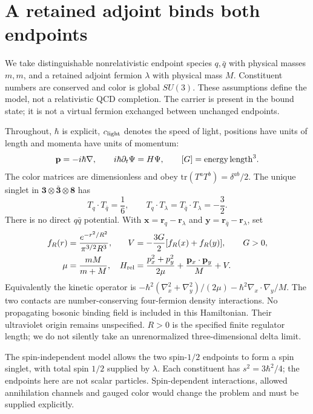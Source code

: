\section{A retained adjoint binds both endpoints}
\label{sec:model}
We take distinguishable nonrelativistic endpoint species $q,\bar q$ with physical masses $m,m$, and a retained adjoint fermion $\lambda$ with physical mass $M$. Constituent numbers are conserved and color is global $SU(3)$. These assumptions define the model, not a relativistic QCD completion. The carrier is present in the bound state; it is not a virtual fermion exchanged between unchanged endpoints.

Throughout, $\hbar$ is explicit, $c_{\rm light}$ denotes the speed of light, positions have units of length and momenta have units of momentum:
\begin{equation}
 \mathbf p=-i\hbar\nabla,\qquad
 i\hbar\partial_t\Psi=H\Psi,\qquad [G]={\rm energy}\,{\rm length}^3 .
\end{equation}
The color matrices are dimensionless and obey
$\mathrm{tr}(T^aT^b)=\delta^{ab}/2$. The unique singlet in
$\mathbf3\otimes\bar{\mathbf3}\otimes\mathbf8$ has
\begin{equation}
 T_q\cdot T_{\bar q}=\frac16,\qquad
 T_q\cdot T_\lambda=T_{\bar q}\cdot T_\lambda=-\frac32.
\end{equation}
There is no direct $q\bar q$ potential. With
$\mathbf x=\mathbf r_q-\mathbf r_\lambda$ and
$\mathbf y=\mathbf r_{\bar q}-\mathbf r_\lambda$, set
\begin{align}
 f_R(r)&=\frac{e^{-r^2/R^2}}{\pi^{3/2}R^3},&
 V&=-\frac{3G}{2}[f_R(x)+f_R(y)],\qquad G>0,\\
 \mu&=\frac{mM}{m+M},&
 H_{\rm rel}&=\frac{p_x^2+p_y^2}{2\mu}
       +\frac{\mathbf p_x\cdot\mathbf p_y}{M}+V .
 \label{eq:hamiltonian}
\end{align}
Equivalently the kinetic operator is
$-\hbar^2(\nabla_x^2+\nabla_y^2)/(2\mu)
-\hbar^2\nabla_x\cdot\nabla_y/M$.
The two contacts are number-conserving four-fermion density interactions. No propagating bosonic binding field is included in this Hamiltonian. Their ultraviolet origin remains unspecified. $R>0$ is the specified finite regulator length; we do not silently take an unrenormalized three-dimensional delta limit.

The spin-independent model allows the two spin-$1/2$ endpoints to form a spin singlet, with total spin $1/2$ supplied by $\lambda$. Each constituent has $s^2=3\hbar^2/4$; the endpoints here are not scalar particles. Spin-dependent interactions, allowed annihilation channels and gauged color would change the problem and must be supplied explicitly.


